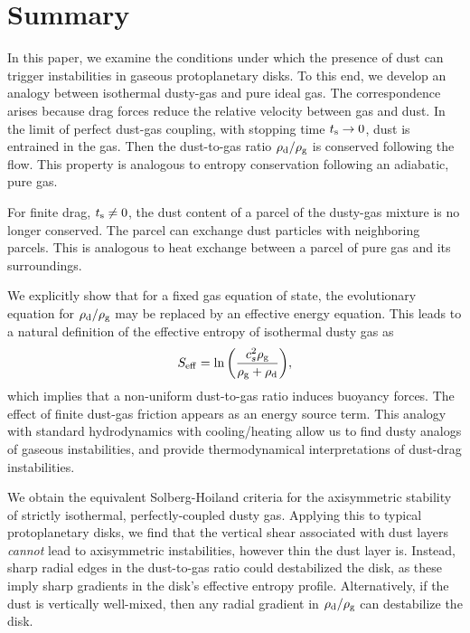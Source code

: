 \section{Summary}\label{summary}
{
In this paper, we examine the conditions under which the presence of
dust can trigger instabilities in gaseous protoplanetary disks.  To this end, 
we develop an analogy between isothermal  dusty-gas and pure ideal
gas. 
} 
The correspondence arises
because drag forces reduce the relative velocity between gas and
dust. In the limit of perfect dust-gas coupling, with stopping time $t_\mathrm{s} \to 0$,  
 dust is entrained in 
the gas. Then the dust-to-gas ratio $\rho_\mathrm{d}/\rho_\mathrm{g}$ is conserved
following the flow. This property is analogous to entropy conservation 
following an adiabatic, pure gas. 

For finite drag, $t_\mathrm{s}\neq 0$, the dust content of a 
parcel of the dusty-gas mixture is no longer conserved. The parcel 
can exchange dust particles with neighboring parcels. %
This is analogous to heat exchange between a parcel of pure gas and
its surroundings.    

We explicitly show that for a fixed gas equation of state, the  
evolutionary equation for $\rho_\mathrm{d}/\rho_\mathrm{g}$ may be replaced by an 
effective energy equation. This leads to a 
natural definition of the effective entropy of isothermal dusty gas as  
\begin{align*}
  S_\mathrm{eff}  = \ln{\left(\frac{c_s^2\rho_\mathrm{g}}{\rho_\mathrm{g}+\rho_\mathrm{d}}\right)},  
\end{align*}
which implies that a non-uniform dust-to-gas ratio induces buoyancy forces.  
The effect of finite dust-gas friction appears as an energy
source term.  This analogy with standard  
hydrodynamics with cooling/heating allow us to find dusty analogs of gaseous
instabilities, and provide thermodynamical interpretations of  
dust-drag instabilities. 


We obtain the equivalent Solberg-Hoiland criteria for the 
axisymmetric stability of strictly isothermal, perfectly-coupled dusty gas.  
Applying this to typical protoplanetary disks, we find that 
the vertical shear associated with dust 
 layers \emph{cannot} lead to axisymmetric  
  instabilities, however thin the dust layer is.    
Instead, sharp radial  edges in the dust-to-gas ratio could destabilized the
disk, as these imply sharp gradients in the disk's effective entropy
profile. Alternatively, if the dust is vertically well-mixed, then any
radial gradient in $\rho_\mathrm{d}/\rho_\mathrm{g}$ can destabilize the disk. 

